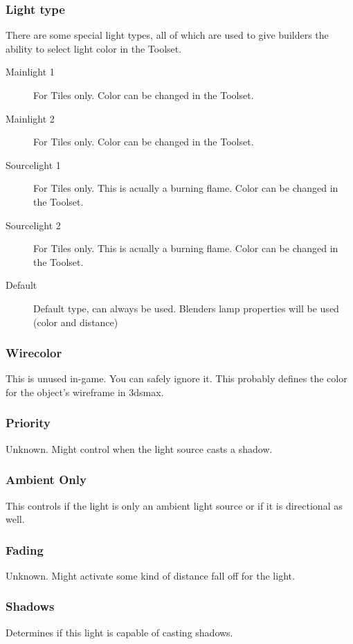 \subsubsection*{Light type}
There are some special light types, all of which are used to give builders
the ability to select light color in the Toolset.
\begin{description}
    \item[Mainlight 1] For Tiles only. Color can be changed in the Toolset.
    \item[Mainlight 2] For Tiles only. Color can be changed in the Toolset.
    \item[Sourcelight 1] For Tiles only. This is acually a burning flame. Color can be changed in the Toolset.
    \item[Sourcelight 2] For Tiles only. This is acually a burning flame. Color can be changed in the Toolset.
    \item[Default] Default type, can always be used. Blenders lamp properties will be used (color and distance)
\end{description}

\subsubsection*{Wirecolor}
This is unused in-game. You can safely ignore it. This probably defines the
color for the object's wireframe in 3dsmax.

\subsubsection*{Priority}
Unknown. Might control when the light source casts a shadow.

\subsubsection*{Ambient Only}
This controls if the light is only an ambient light source or
if it is directional as well.

\subsubsection*{Fading}
Unknown. Might activate some kind of distance fall off for the light.

\subsubsection*{Shadows}
Determines if this light is capable of casting shadows.

